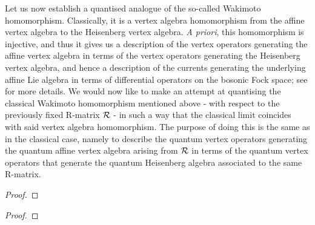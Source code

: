         Let us now establish a quantised analogue of the so-called Wakimoto homomorphism. Classically, it is a vertex algebra homomorphism from the affine vertex algebra to the Heisenberg vertex algebra. \textit{A priori}, this homomorphism is injective, and thus it gives us a description of the vertex operators generating the affine vertex algebra in terms of the vertex operators generating the Heisenberg vertex algebra, and hence a description of the currents generating the underlying affine Lie algebra in terms of differential operators on the bosonic Fock space; see \cite{frenkel_ben_zvi_vertex_algebras_and_algebraic_curves} for more details. We would now like to make an attempt at quantising the classical Wakimoto homomorphism mentioned above - with respect to the previously fixed R-matrix $\mathcal{R}$ - in such a way that the classical limit coincides with said vertex algebra homomorphism. The purpose of doing this is the same as in the classical case, namely to describe the quantum vertex operators generating the quantum affine vertex algebra arising from $\mathcal{R}$ in terms of the quantum vertex operators that generate the quantum Heisenberg algebra associated to the same R-matrix.
        \begin{proposition} \label{prop: quantum_wakimoto_homomorphism}
            
        \end{proposition}
            \begin{proof}
                
            \end{proof}
        \begin{corollary} \label{coro: quantum_wakimoto_modules}
            
        \end{corollary}
            \begin{proof}
                
            \end{proof}